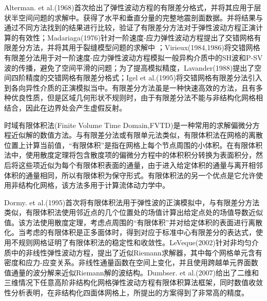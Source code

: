 \documentclass[12pt]{article}
\newcommand{\upcite}[1]{\textsuperscript{\textsuperscript{\cite{#1}}}}
\begin{document}
Alterman. et al.(1968)首次给出了弹性波动方程的有限差分格式，并将其应用于层状半空间问题的求解中。获得了水平和垂直分量的完整地震剖面数据。并将结果与通过不同方法找到的结果进行比较，验证了有限差分方法对于弹性波动方程正演计算的有效性\upcite{Alterman1968}；Madariaga(1976)针对一阶速度-应力弹性波动方程提出了交错网格有限差分方法，并将其用于裂缝模型问题的求解中\upcite{Madariaga1976}
；Virieux(1984,1986)将交错网格有限差分法用于对一阶速度-应力弹性波动方程模拟一般异构介质中的SH波和P-SV波的传播，避免了空间平滑的问题\upcite{Virieux1984,Virieux1986}；为了提高模拟精度，Lavander(1988)提出了空间四阶精度的交错网格有限差分格式\upcite{Lavander1988}；Igel et al.(1995)将交错网格有限差分法引入到各向异性介质的正演模拟当中\upcite{Igel1995}。有限差分方法虽是一种快速高效的方法，且有多种优良性质，但是区域几何形状不规则时，由于有限差分法不能与非结构化网格相结合，因此在边界处会产生虚假反射。
\par
时域有限体积法(Finite Volume Time Domain,FVTD)是一种常用的求解偏微分方程近似解的数值方法\upcite{LeVeque2002M,Toro2013}。与有限差分法或有限单元法类似，有限体积法在网格的离散位置上计算当前值，“有限体积”是指在网格上每个节点周围的小体积。在有限体积法中，使用散度定理将包含散度项的偏微分方程中的体积积分转换为表面积分，然后将这些项近似为每个有限体积表面的通量，由于进入给定体积的通量与离开相邻体积的通量相同，所以有限体积为保守形式。有限体积法的另一个优点是它允许使用非结构化网格，该方法多用于计算流体动力学中。
\par
Dormy. et al.(1995)首次将有限体积法用于弹性波的正演模拟中，与有限差分方法类似，有限体积法使用邻近点的几个位置处的场值计算出给定点处的场值导数近似值。该方法使用散度定理，考虑点周围的“有限体积”并对给定体积的表面进行离散化。当考虑的有限体积是正多面体时，得到对应于标准中心有限差分的表达式，使用不规则网格证明了有限体积法的稳定性和收敛性\upcite{Dormy1995}。LeVeque(2002)针对非均匀介质中的非线性弹性波动方程，提出了近似Riemann求解器，其中每个网格单元含有密度和应力-应变关系。非线性通量函数在空间上变化，并且使用跨越单元界面数值通量的波分解来近似Riemann解的波结构\upcite{LeVeque2002J}。Dumbser. et al.(2007)给出了二维和三维情况下任意高阶非结构化网格弹性波动方程有限体积算法框架，同时数值收敛性分析表明，在非结构化四面体网格上，所提出的方案得到了非常高的精度\upcite{Dumbser2007FVM}。
\par
\end{document}
